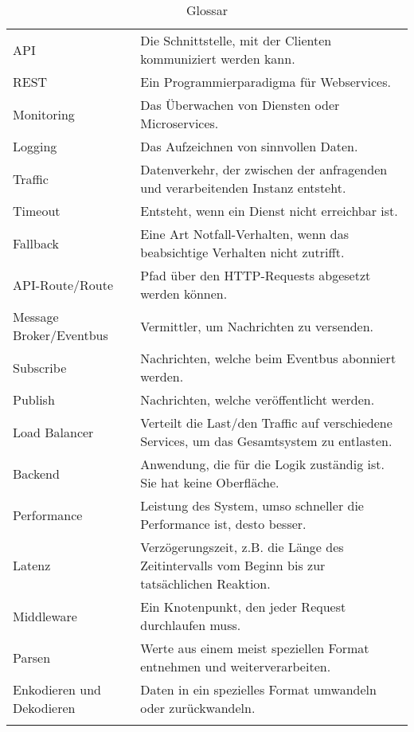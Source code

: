 \begin{longtable}{lp{10cm}}
	API & Die Schnittstelle, mit der Clienten kommuniziert werden kann.\\
	REST & Ein Programmierparadigma für Webservices. \\
	Monitoring & Das Überwachen von Diensten oder Microservices.\\
	Logging & Das Aufzeichnen von sinnvollen Daten.\\
	Traffic & Datenverkehr, der zwischen der anfragenden und verarbeitenden Instanz entsteht.\\
	Timeout & Entsteht, wenn ein Dienst nicht erreichbar ist.\\
	Fallback & Eine Art Notfall-Verhalten, wenn das beabsichtige Verhalten nicht zutrifft.\\
	API-Route/Route & Pfad über den HTTP-Requests abgesetzt werden können.\\
	Message Broker/Eventbus & Vermittler, um Nachrichten zu versenden.  \\
	Subscribe & Nachrichten, welche beim Eventbus abonniert werden. \\
	Publish & Nachrichten, welche veröffentlicht werden. \\
	Load Balancer & Verteilt die Last/den Traffic auf verschiedene Services, um das Gesamtsystem zu entlasten.\\
	Backend & Anwendung, die für die Logik zuständig ist. Sie hat keine Oberfläche.\\
	Performance & Leistung des System, umso schneller die Performance ist, desto besser.\\
	Latenz & Verzögerungszeit, z.B. die Länge des Zeitintervalls vom Beginn bis zur tatsächlichen Reaktion.\\
	Middleware & Ein Knotenpunkt, den jeder Request durchlaufen muss. \\
	Parsen & Werte aus einem meist speziellen Format entnehmen und weiterverarbeiten. \\ 
	Enkodieren und Dekodieren & Daten in ein spezielles Format umwandeln oder zurückwandeln.\\
	\caption[Glossar]{Glossar}
\end{longtable}
